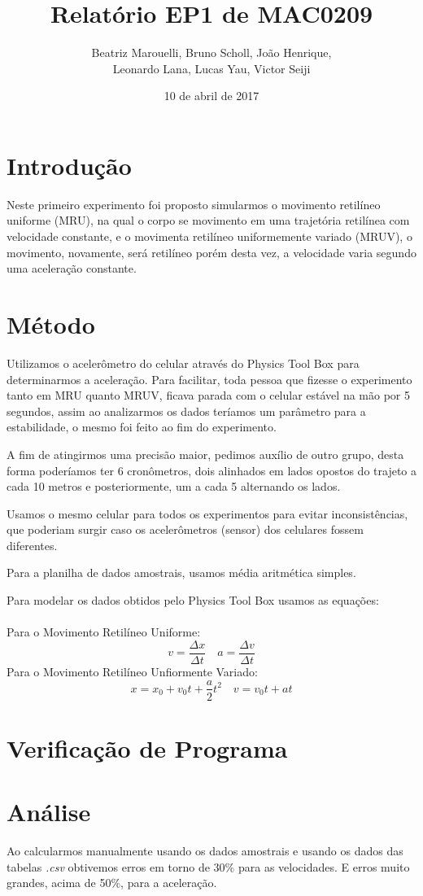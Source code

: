 \documentclass[a4paper, 12pt]{article}
\title{Relatório EP1 de MAC0209}
\author{Beatriz Marouelli, Bruno Scholl, João Henrique, 
\\ Leonardo Lana, Lucas Yau, Victor Seiji}
\date{10 de abril de 2017}
\begin{document}
\maketitle

\section*{Introdução}
Neste primeiro experimento foi proposto simularmos o movimento retilíneo
uniforme (MRU), na qual o corpo se movimento em uma trajetória retilínea com
velocidade constante, e o movimenta retilíneo uniformemente variado (MRUV),
o movimento, novamente, será retilíneo porém desta vez, a velocidade varia
segundo uma aceleração constante.

\section*{Método}
Utilizamos o acelerômetro do celular através do Physics Tool Box para
determinarmos a aceleração. Para facilitar, toda pessoa que fizesse o experimento 
tanto em MRU quanto MRUV, ficava parada com o celular estável na mão por 5 segundos, 
assim ao analizarmos os dados teríamos um parâmetro para a estabilidade, o mesmo 
foi feito ao fim do experimento.

A fim de atingirmos uma precisão maior, pedimos auxílio de outro grupo, desta
forma poderíamos ter 6 cronômetros, dois alinhados em lados opostos do trajeto
a cada 10 metros e posteriormente, um a cada 5 alternando os lados.

Usamos o mesmo celular para todos os experimentos para evitar inconsistências,
que poderiam surgir caso os acelerômetros (sensor) dos celulares fossem diferentes.

Para a planilha de dados amostrais, usamos média aritmética simples.

Para modelar os dados obtidos pelo Physics Tool Box usamos as equações: \\
\\
Para o Movimento Retilíneo Uniforme:
$$v = \frac{\Delta x}{\Delta t} \quad a = \frac{\Delta v}{\Delta t}$$
Para o Movimento Retilíneo Unfiormente Variado:
$$x = x_0 + v_0 t + \frac{a}{2} t^2 \quad v = v_0 t + at$$

\section*{Verificação de Programa}

\section*{Análise}
Ao calcularmos manualmente usando os dados amostrais e usando os dados das
tabelas \textit{.csv} obtivemos erros em torno de 30\% para as velocidades.
E erros muito grandes, acima de 50\%, para a aceleração. 
\end{document}

